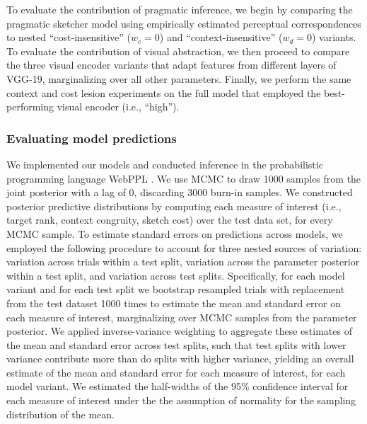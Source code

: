 \documentclass[9pt,twocolumn,twoside]{pnas-new}
\begin{document}
{To evaluate the contribution of pragmatic inference, we begin by comparing the pragmatic sketcher model using empirically estimated perceptual correspondences to nested ``cost-insensitive'' ($w_c = 0$) and ``context-insensitive'' ($w_d = 0$) variants. To evaluate the contribution of visual abstraction, we then proceed to compare the three visual encoder variants that adapt features from different layers of VGG-19, marginalizing over all other parameters. Finally, we perform the same context and cost lesion experiments on the full model that employed the best-performing visual encoder (i.e., ``high'').

\subsubsection*{Evaluating model predictions}


We implemented our models and conducted inference in the probabilistic programming language WebPPL \cite{goodman2014design}.
We use MCMC to draw 1000 samples from the joint posterior with a lag of 0, discarding 3000 burn-in samples.
We constructed posterior predictive distributions by computing each measure of interest (i.e., target rank, context congruity, sketch cost) over the test data set, for every MCMC sample.
To estimate standard errors on predictions across models, we employed the following procedure to account for three nested sources of variation: variation across trials within a test split, variation across the parameter posterior within a test split, and variation across test splits.  
Specifically, for each model variant and for each test split we bootstrap resampled trials with replacement from the test dataset 1000 times to estimate the mean and standard error on each measure of interest, marginalizing over MCMC samples from the parameter posterior. 
We applied inverse-variance weighting to aggregate these estimates of the mean and standard error across test splits, such that test splits with lower variance contribute more than do splits with higher variance, yielding an overall estimate of the mean and standard error for each measure of interest, for each model variant. 
We estimated the half-widths of the 95\% confidence interval for each measure of interest under the the assumption of normality for the sampling distribution of the mean.

}
\end{document}
